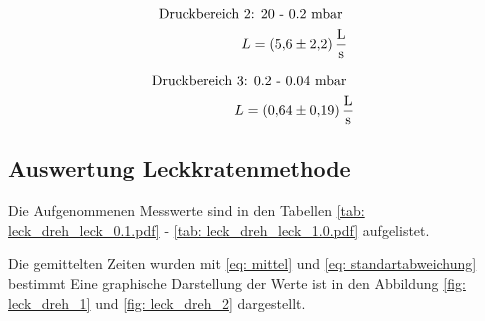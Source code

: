 \begin{align}
  \label{eq:dreh_leit_2}
  \begin{aligned}
  \text{Druckbereich 2} &\text{: 20 - 0.2 mbar}& \\
   L&=\SI{5.6\pm 2.2}{\litre\per\second}
\end{aligned}
\end{align}

\begin{align}
  \label{eq:dreh_leit_3}
  \begin{aligned}
  \text{Druckbereich 3} &\text{: 0.2 - 0.04 mbar}& \\
   L&=\SI{0.64\pm 0.19}{\litre\per\second}
\end{aligned}
\end{align}

\subsection{Auswertung Leckkratenmethode}

Die Aufgenommenen Messwerte sind in den Tabellen \ref{tab: leck_dreh_leck_0.1.pdf} - \ref{tab: leck_dreh_leck_1.0.pdf} aufgelistet.





Die gemittelten Zeiten wurden mit \eqref{eq: mittel} und \eqref{eq: standartabweichung} bestimmt
Eine graphische Darstellung der Werte ist in den Abbildung \ref{fig: leck_dreh_1} und \ref{fig: leck_dreh_2} dargestellt.

